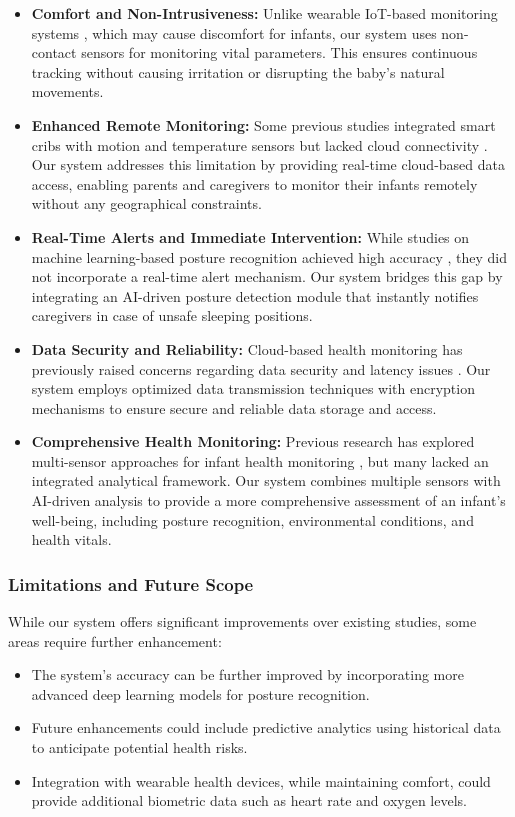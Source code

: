 \documentclass[conference]{IEEEtran}
\begin{document}
\begin{itemize}
    \item \textbf{Comfort and Non-Intrusiveness:} Unlike wearable IoT-based monitoring systems , which may cause discomfort for infants, our system uses non-contact sensors for monitoring vital parameters\cite{ref1}. This ensures continuous tracking without causing irritation or disrupting the baby's natural movements.
    
    \item \textbf{Enhanced Remote Monitoring:} Some previous studies integrated smart cribs with motion and temperature sensors but lacked cloud connectivity \cite{ref2}. Our system addresses this limitation by providing real-time cloud-based data access, enabling parents and caregivers to monitor their infants remotely without any geographical constraints.

    \item \textbf{Real-Time Alerts and Immediate Intervention:} While studies on machine learning-based posture recognition achieved high accuracy , they did not incorporate a real-time alert mechanism\cite{ref4, ref5}. Our system bridges this gap by integrating an AI-driven posture detection module that instantly notifies caregivers in case of unsafe sleeping positions.

    \item \textbf{Data Security and Reliability:} Cloud-based health monitoring has previously raised concerns regarding data security and latency issues \cite{ref3, ref6}. Our system employs optimized data transmission techniques with encryption mechanisms to ensure secure and reliable data storage and access.

    \item \textbf{Comprehensive Health Monitoring:} Previous research has explored multi-sensor approaches for infant health monitoring , but many lacked an integrated analytical framework\cite{ref8, ref9}. Our system combines multiple sensors with AI-driven analysis to provide a more comprehensive assessment of an infant’s well-being, including posture recognition, environmental conditions, and health vitals.

\end{itemize}

\subsubsection{Limitations and Future Scope}
While our system offers significant improvements over existing studies, some areas require further enhancement:
\begin{itemize}
    \item The system's accuracy can be further improved by incorporating more advanced deep learning models for posture recognition.
    \item Future enhancements could include predictive analytics using historical data to anticipate potential health risks.
    \item Integration with wearable health devices, while maintaining comfort, could provide additional biometric data such as heart rate and oxygen levels.
\end{itemize}
\end{document}

